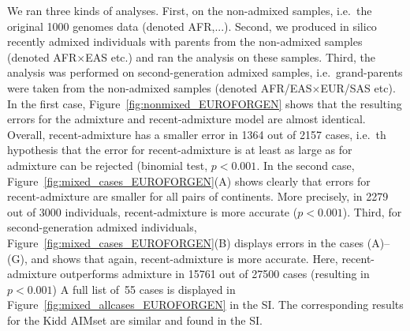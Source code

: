 \documentclass[12pt]{article}
\theoremstyle{definition}
\begin{document}
We ran three kinds of analyses. First, on the non-admixed samples,
i.e.\ the original 1000 genomes data (denoted AFR,...). Second, we
produced in silico recently admixed individuals with parents from the
non-admixed samples (denoted AFR$\times$EAS etc.) and ran the analysis
on these samples. Third, the analysis was performed on
second-generation admixed samples, i.e.\ grand-parents were taken from
the non-admixed samples (denoted AFR/EAS$\times$EUR/SAS etc). In the
first case, Figure~\ref{fig:nonmixed_EUROFORGEN} shows that the
resulting errors for the admixture and recent-admixture model are
almost identical. Overall, recent-admixture has a smaller error in
1364 out of 2157 cases, i.e.\ th hypothesis that the error for
recent-admixture is at least as large as for admixture can be rejected
(binomial test, $p<0.001$. %
In the second case, Figure~\ref{fig:mixed_cases_EUROFORGEN}(A) shows
clearly that errors for recent-admixture are smaller for all pairs of
continents. More precisely, in 2279 out of 3000 individuals,
recent-admixture is more accurate ($p<0.001$). %
Third, for second-generation admixed individuals,
Figure~\ref{fig:mixed_cases_EUROFORGEN}(B) displays errors in the
cases (A)--(G), and shows that again, recent-admixture is more
accurate. Here, recent-admixture outperforms admixture in 15761 out of
27500 cases (resulting in $p<0.001$) %
A full list of~55 cases is displayed in
Figure~\ref{fig:mixed_allcases_EUROFORGEN} in the SI. The
corresponding results for the Kidd AIMset are similar and found in the
SI.
\end{document}
